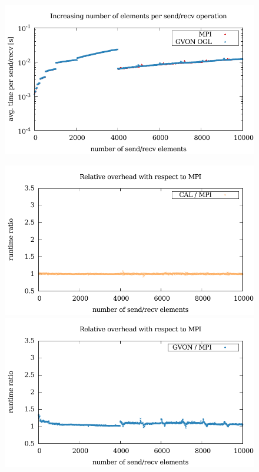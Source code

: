 \begin{figure}[H]
\begin{minipage}[t]{0.5\textwidth}
    \includegraphics[width=\textwidth]{plots/50_nsize_one_lookup_gvon_laser}
  \end{minipage}%
  \begin{minipage}[t]{0.5\textwidth}
    \includegraphics[width=\textwidth]{plots/50_nsize_overhead_cal_laser}
    \includegraphics[width=\textwidth]{plots/50_nsize_overhead_gvon_laser}

\end{minipage}
\end{figure}
